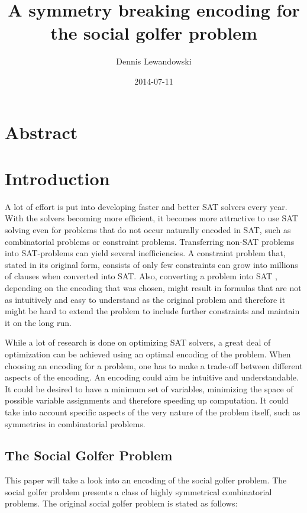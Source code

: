\documentclass[a4paper]{scrartcl}
\title{A symmetry breaking encoding for the social golfer problem}
\author{Dennis Lewandowski}
\date{2014-07-11}
\begin{document}
\maketitle

\section{Abstract}

\section{Introduction}

A lot of effort is put into developing faster and better SAT solvers every year. With the solvers becoming more efficient, it becomes more attractive to use SAT solving even for problems that do not occur naturally encoded in SAT, such as combinatorial problems or constraint problems. Transferring non-SAT problems into SAT-problems can yield several inefficiencies. A constraint problem that, stated in its original form, consists of only few constraints can grow into millions of clauses when converted into SAT. Also, converting a problem into SAT , depending on the encoding that was chosen, might result in formulas that are not as intuitively and easy to understand as the original problem and therefore it might be hard to extend the problem to include further constraints and maintain it on the long run.

While a lot of research is done on optimizing SAT solvers, a great deal of optimization can be achieved using an optimal encoding of the problem. When choosing an encoding for a problem, one has to make a trade-off between different aspects of the encoding. An encoding could aim be intuitive and understandable. It could be desired to have a minimum set of variables, minimizing the space of possible variable assignments and therefore speeding up computation. It could take into account specific aspects of the very nature of the problem itself, such as symmetries in combinatorial problems.

\subsection{The Social Golfer Problem}

This paper will take a look into an encoding of the social golfer problem. The social golfer problem presents a class of highly symmetrical combinatorial problems. The original social golfer problem is stated as follows:
\end{document}
